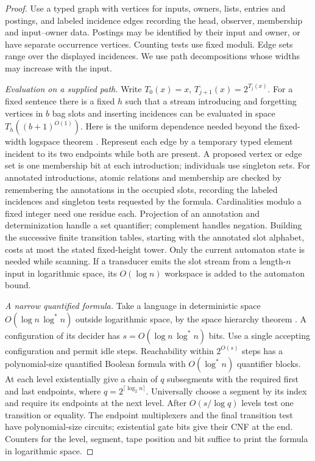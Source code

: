 \begin{proof}
Use a typed graph with vertices for inputs, owners, lists, entries and
postings, and labeled incidence edges recording the head, observer,
membership and input--owner data. Postings may be identified by their
input and owner, or have separate occurrence vertices. Counting tests
use fixed moduli. Edge sets range over the displayed incidences.
We use path decompositions whose widths may increase with the input.

\emph{Evaluation on a supplied path.}
Write $T_0(x)=x$, $T_{j+1}(x)=2^{T_j(x)}$. For a fixed sentence
there is a fixed $h$ such that a stream introducing and forgetting
vertices in $b$ bag slots and inserting incidences can be evaluated in
space $T_h((b+1)^{O(1)})$. Here is the uniform dependence needed
beyond the fixed-width logspace theorem \cite{ElberfeldJakobyTantau2010}.
Represent each edge by a temporary typed element incident to its two
endpoints while both are present. A proposed vertex or edge set is
one membership bit at each introduction; individuals use singleton
sets. For annotated introductions, atomic relations and membership
are checked by remembering the annotations in the occupied slots,
recording the labeled incidences and singleton tests requested by the
formula. Cardinalities modulo a fixed integer need one residue each.
Projection of an annotation and determinization handle a set
quantifier; complement handles negation. Building the successive
finite transition tables, starting with the annotated slot alphabet,
costs at most the stated fixed-height tower. Only the current automaton
state is needed while scanning. If a transducer emits the slot stream
from a length-$n$ input in logarithmic space, its $O(\log n)$
workspace is added to the automaton bound.

\emph{A narrow quantified formula.}
Take a language in deterministic space
$O(\log n\,\log^*n)$ outside logarithmic space, by the space hierarchy
theorem \cite{StearnsHartmanisLewis1965}. A configuration of its
decider has $s=O(\log n\,\log^*n)$ bits. Use a single accepting
configuration and permit idle steps. Reachability within $2^{O(s)}$
steps has a polynomial-size quantified Boolean formula with
$O(\log^*n)$ quantifier blocks. At each level existentially give a
chain of $q$ subsegments with the required first and last endpoints,
where $q=2^{\lceil\log_2 n\rceil}$. Universally choose a segment by
its index and require its endpoints at the next level. After
$O(s/\log q)$ levels test one transition or equality. The endpoint
multiplexers and the final transition test have polynomial-size
circuits; existential gate bits give their CNF at the end. Counters
for the level, segment, tape position and bit suffice to print the
formula in logarithmic space.


\end{proof}
